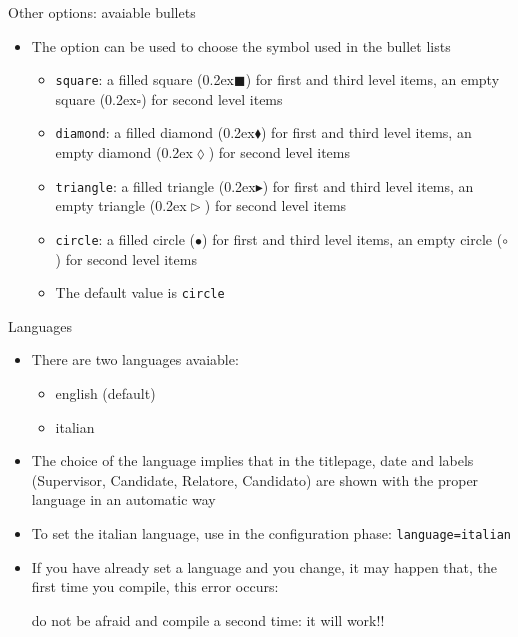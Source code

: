 \begin{frame}[t,fragile]{Other options: avaiable bullets}
\begin{itemize}
\item The  option can be used to choose the symbol used in the bullet lists
  \begin{itemize}
  \item \verb!square!: a filled square
        ({\tiny\raise0.2ex\hbox{$\blacksquare$}}) for
        first and third level items, an empty square
        ({\tiny\raise0.2ex\hbox{$\square$}}) for
        second level items
  \item \verb!diamond!: a filled diamond
        ({\tiny\raise0.2ex\hbox{$\blacklozenge$}}) for
        first and third level items, an empty diamond
        ({\tiny\raise0.2ex\hbox{$\lozenge$}}) for
        second level items
  \item \verb!triangle!: a filled triangle
        ({\tiny\raise0.2ex\hbox{$\blacktriangleright$}}) for
        first and third level items, an empty triangle
        ({\tiny\raise0.2ex\hbox{$\vartriangleright$}}) for
        second level items
  \item \verb!circle!: a filled circle ({$\bullet$})
        for first and third level items, an empty circle
        ({$\circ$}) for second level items
  \item The default value is \verb!circle!
  \end{itemize}
\end{itemize}
\end{frame}

\begin{frame}[t,fragile]{Languages}
\begin{itemize}
\item There are two languages avaiable:
\begin{itemize}
\item english (default)
\item italian 
\end{itemize}
\item The choice of the language implies that in the titlepage, date and labels (Supervisor, Candidate, Relatore, Candidato) are shown with the proper language in an automatic way
\item To set the italian language, use in the configuration phase:
\verb!language=italian!
\item If you have already set a language and you change, it may happen that, the first time you compile, this error occurs: \begin{flushleft}
\end{flushleft}
do not be afraid and compile a second time: it will work!!
\end{itemize}
\end{frame}

